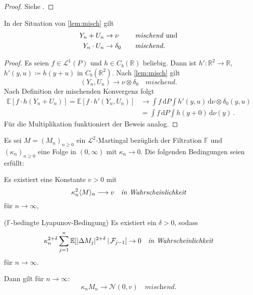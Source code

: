 \documentclass[ngerman,a4paper,11pt]{scrartcl}
\newcommand{\EE}{\mathbb{E}}
\newcommand{\FF}{\mathbb{F}}
\newcommand{\RR}{\mathbb{R}}
\newcommand{\ff}{\mathcal{F}}
\renewcommand{\ll}{\mathcal{L}}
\newcommand{\nn}{\mathcal{N}}
\newcommand{\Cb}[1]{C_b(#1)}
\newcommand{\expect}[1]{\EE[#1]}
\newcommand{\condexp}[2]{\EE[#1\,|\,#2]}
\newcommand{\dvar}[1]{\,\mathrm{d}#1}
\DeclarePairedDelimiter{\sprod}{\langle}{\rangle}	%
\DeclarePairedDelimiter{\abs}{\lvert}{\rvert}		%
\begin{document}
\begin{proof}
 Siehe \cite[Korollar~5.29(a)]{lpw}.
\end{proof}
\begin{cor}\label{cor:mischsum}
  In der Situation von \cref{lem:misch} gilt
  \begin{equation*}
\begin{aligned}
 Y_n + U_n&\to\nu\quad &&\text{\textit{mischend} und} \\
 Y_n\cdot U_n&\to\delta_0 \quad &&\textit{mischend.}
\end{aligned}
\end{equation*}
\end{cor}
\begin{proof}
  Es seien $f\in\ll^1(P)$ und $h\in\Cb{\RR}$ beliebig. Dann ist
  $h':\RR^2\to\RR$, $h'(y,u)\coloneqq h(y+u)$ in $\Cb{\RR^2}$. Nach
  \cref{lem:misch} gilt
\begin{equation*}
 (Y_n,U_n)\to\nu\otimes\delta_0\quad\textit{mischend.}
\end{equation*}
Nach Definition der mischenden Konvergenz folgt
\begin{align*}
  \expect{f\cdot h(Y_n+U_n)}=\expect{f\cdot h'(Y_n,U_n)}&\to\int f\dvar{P}\int h'(y,u) \dvar{\nu\otimes\delta_0(y,u)}\\
&=\int f\dvar{P}\int h(y+0) \dvar{\nu(y)}\,.
\end{align*}
Für die Multiplikation funktioniert der Beweis analog.
\end{proof}
\begin{thm}\label{thm:clt}
  Es sei $M=(M_n)_{n\geq 0}$ ein $\ll^2$-Martingal bezüglich der Filtration
  $\FF$ und $(\kappa_n)_{n\geq 0}$ eine Folge in $(0,\infty)$ mit $\kappa_n\to 0$. Die
  folgenden Bedingungen seien erfüllt:
 \begin{thmasslist}
 \item Es existiert eine Konstante $v>0$ mit \label{clt:vora}
   \begin{equation*}
     \kappa_n^2\sprod{M}_n\longrightarrow v\quad\textit{in Wahrscheinlichkeit}
   \end{equation*}
   für $n\to\infty$,
 \item ($\FF$-bedingte Lyapunov-Bedingung) Es existiert ein $\delta >0$, sodass \label{clt:vorb}
   \begin{equation*}
    \kappa_n^{2+\delta} \sum_{j=1}^n\condexp{\abs{\Delta M_j}^{2+\delta}}{\ff_{j-1}}\to 0\quad\textit{in Wahrscheinlichkeit}
   \end{equation*}
für ${n\to\infty}$.
 \end{thmasslist}
Dann gilt für ${n\to\infty}$:
\begin{equation*}
 \kappa_nM_n\to\nn(0,v)\quad\textit{mischend.} 
\end{equation*}
\end{thm}
\end{document}
